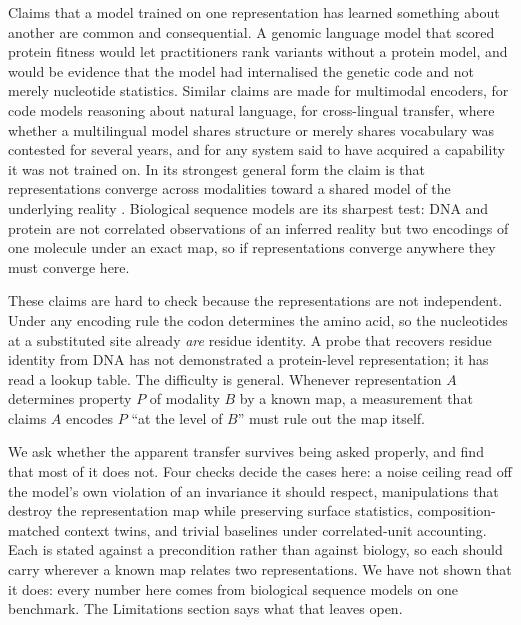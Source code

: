 \documentclass[11pt]{article}
\begin{document}
Claims that a model trained on one representation has learned something about
another are common and consequential. A genomic language model that scored protein
fitness would let practitioners rank variants without a protein model, and would be
evidence that the model had internalised the genetic code and not merely nucleotide
statistics. Similar claims are made for multimodal encoders, for code models
reasoning about natural language, for cross-lingual transfer, where whether a
multilingual model shares structure or merely shares vocabulary was contested for
several years, and for any system said to have acquired a capability it was not
trained on. In its strongest general form the claim is that
representations converge across modalities toward a shared model of the underlying
reality \citep{huh2024platonic}. Biological sequence models are its sharpest test:
DNA and protein are not correlated observations of an inferred reality but two
encodings of one molecule under an exact map, so if representations converge
anywhere they must converge here.

These claims are hard to check because the representations are not independent.
Under any encoding rule the codon determines the amino acid, so the nucleotides at
a substituted site already \emph{are} residue identity. A probe that recovers
residue identity from DNA has not demonstrated a protein-level representation; it
has read a lookup table. The difficulty is general. Whenever representation $A$
determines property $P$ of modality $B$ by a known map, a measurement that claims
$A$ encodes $P$ ``at the level of $B$'' must rule out the map itself.

We ask whether the apparent transfer survives being asked properly, and find that
most of it does not. Four checks decide the cases here: a noise ceiling read off
the model's own violation of an invariance it should respect, manipulations that
destroy the representation map while preserving surface statistics,
composition-matched context twins, and trivial baselines under correlated-unit
accounting. Each is stated against a precondition rather than against biology, so
each should carry wherever a known map relates two representations. We have not
shown that it does: every number here comes from biological sequence models on one
benchmark. The Limitations section says what that leaves open.
\end{document}
